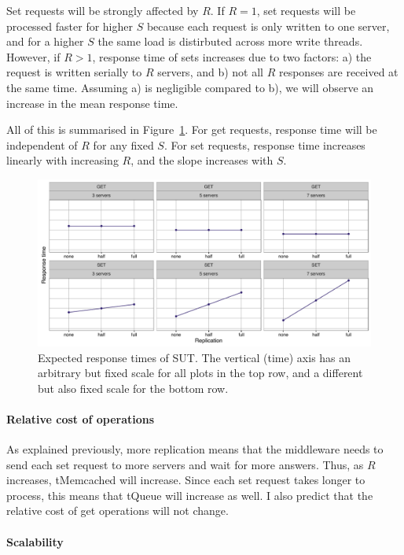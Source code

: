 \documentclass[11pt]{article}
\begin{document}
Set requests will be strongly affected by $R$. If $R=1$, set requests will be processed faster for higher $S$ because each request is only written to one server, and for a higher $S$ the same load is distirbuted across more write threads. However, if $R>1$, response time of sets increases due to two factors: a) the request is written serially to $R$ servers, and b) not all $R$ responses are received at the same time. Assuming a) is negligible compared to b), we will observe an increase in the mean response time.

All of this is summarised in Figure~\ref{fig:exp2:hyp:replication}. For get requests, response time will be independent of $R$ for any fixed $S$. For set requests, response time increases linearly with increasing $R$, and the slope increases with $S$.

\begin{figure}[h]
\centering
\includegraphics[width=\textwidth]{figures/hypothesis_replication.pdf}
\caption{Expected response times of SUT. The vertical (time) axis has an arbitrary but fixed scale for all plots in the top row, and a different but also fixed scale for the bottom row.}
\label{fig:exp2:hyp:replication}
\end{figure}

\paragraph{Relative cost of operations}
As explained previously, more replication means that the middleware needs to send each set request to more servers and wait for more answers. Thus, as $R$ increases, tMemcached will increase. Since each set request takes longer to process, this means that tQueue will increase as well. I also predict that the relative cost of get operations will not change.


\paragraph{Scalability}
\end{document}
